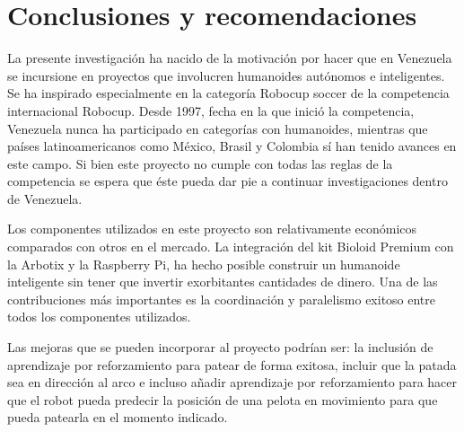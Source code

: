 \chapter{Conclusiones y recomendaciones} 

\label{chap:conclusiones}

La presente investigación ha nacido de la motivación por hacer que en Venezuela se incursione en proyectos que involucren humanoides autónomos e inteligentes. Se ha inspirado especialmente en la categoría Robocup soccer de la competencia internacional Robocup. Desde 1997, fecha en la que inició la competencia, Venezuela nunca ha participado en categorías con humanoides, mientras que países latinoamericanos como México, Brasil y Colombia sí han tenido avances en este campo. Si bien este proyecto no cumple con todas las reglas de la competencia se espera que éste pueda dar pie a continuar investigaciones dentro de Venezuela.

Los componentes utilizados en este proyecto son relativamente económicos comparados con otros en el mercado. La integración del kit Bioloid Premium con la Arbotix y la Raspberry Pi, ha hecho posible construir un humanoide inteligente sin tener que invertir exorbitantes cantidades de dinero. Una de las contribuciones más importantes es la coordinación y paralelismo exitoso entre todos los componentes utilizados.

Las mejoras que se pueden incorporar al proyecto podrían ser: la inclusión de aprendizaje por reforzamiento para patear de forma exitosa, incluir que la patada sea en dirección al arco e incluso añadir aprendizaje por reforzamiento para hacer que el robot pueda predecir la posición de una pelota en movimiento para que pueda patearla en el momento indicado.




